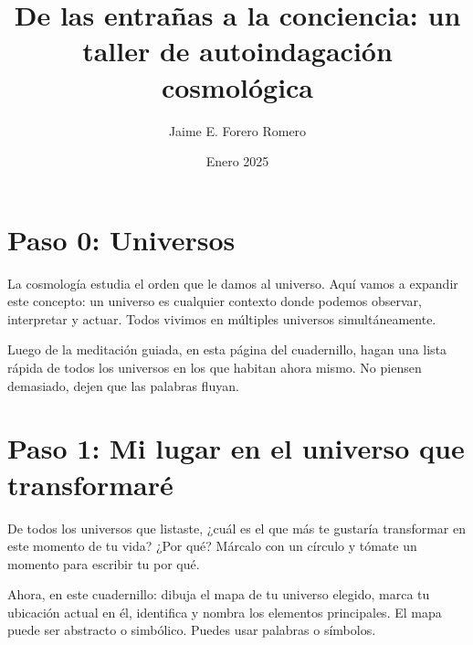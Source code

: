 \documentclass[statementpaper,oneside,article,10pt]{memoir}
\newcommand{\BackgroundPic}[1]{%
\put(0,0){%
\parbox[b][\paperheight]{\paperwidth}{%
\vfill
\centering
{\transparent{0.4} \texttt{[image: \#1]}}%
\vfill
}}}
\begin{document}

\title{De las entrañas a la conciencia: un taller de autoindagación cosmológica}
\author{Jaime E. Forero Romero}
\date{Enero 2025}


\begingroup
\let\cleardoublepage\clearpage


\begin{titlingpage}
\maketitle


\end{titlingpage}

\endgroup

\pagestyle{empty}




\section{Paso 0: Universos}

La cosmología estudia el orden que le damos al universo. Aquí vamos a expandir este concepto: un universo es cualquier contexto donde podemos observar, interpretar y actuar. Todos vivimos en múltiples universos simultáneamente.

Luego de la meditación guiada, en esta página del cuadernillo, hagan una lista rápida de todos los universos en los que habitan ahora mismo. No piensen demasiado, dejen que las palabras fluyan.

\newpage
\section{Paso 1: Mi lugar en el universo que transformaré}

De todos los universos que listaste, ¿cuál es el que más te gustaría transformar en este momento de tu vida? ¿Por qué?
Márcalo con un círculo y tómate un momento para escribir tu por qué.

Ahora, en este cuadernillo: dibuja el mapa de tu universo elegido, marca tu ubicación actual en él, identifica y nombra los elementos principales. El mapa puede ser abstracto o simbólico. Puedes usar palabras o símbolos. 
\newpage
\end{document}
